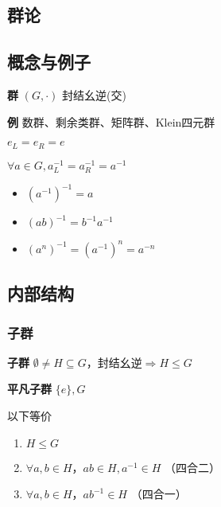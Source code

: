 \documentclass[a4paper,10pt]{ctexart}
\newcommand*{\impl}{\Rightarrow}
\renewcommand*{\leq}{\leqslant}
\begin{document}
\begin{multicols}{3}
    \section{群论}

    \subsection{概念与例子}

    \textbf{群} $(G, \cdot)$ 封结幺逆(交)

    \textbf{例} 数群、剩余类群、矩阵群、Klein四元群

    \begin{theorem}[幺元性质]
        $e_L = e_R = e$
    \end{theorem}

    \begin{theorem}[逆元性质]
        $\forall a \in G, a_L^{-1} = a_R^{-1} = a^{-1}$

        \begin{itemize}
            \item $(a^{-1})^{-1} = a$
            \item $(ab)^{-1}=b^{-1}a^{-1}$
            \item $(a^n)^{-1}=(a^{-1})^n=a^{-n}$
        \end{itemize}
    \end{theorem}

    \subsection{内部结构}

    \subsubsection{子群}

    \textbf{子群} $\emptyset \!\neq\! H \!\subseteq\! G$，封结幺逆$\impl H \!\leq\! G$

    \textbf{平凡子群} $\{e\}, G$

    \begin{theorem}[子群判则]
        以下等价
        \begin{enumerate}
            \item $H \leq G$
            \item $\forall a, b \!\in\! H$，$ab \!\in\! H, a^{-1} \!\in\! H$ （四合二）
            \item $\forall a, b \!\in\! H$，$ab^{-1} \!\in\! H$ （四合一）
        \end{enumerate}
    \end{theorem}


\end{multicols}
\end{document}
